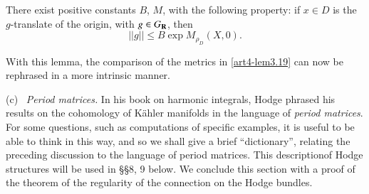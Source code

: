 \setcounter{lemma}{22}
\begin{lemma}\label{art4-lem3.23}
There exist positive constants $B$, $M$, with the following property: if $x \in D$ is the $g$-translate of the origin, with $g \in G_{\mathbf{R}}$, then
$$
||g|| \leqslant B \exp M_{\rho_D} (X,0).
$$
\end{lemma}

With this lemma, the comparison of the metrics in \eqref{art4-lem3.19} can now be rephrased in a more intrinsic manner.

\medskip
\noindent
(c)~ \textit{Period matrices.} In his book \cite{art4-key30} on harmonic integrals, Hodge phrased his results on the cohomology of K\"ahler manifolds in the language of \textit{period matrices}. For some questions, such as computations of specific examples, it is useful to be able to think in this way, and so we shall give a brief ``dictionary'', relating the preceding discussion to the language of period matrices. This description\pageoriginale of Hodge structures will be used in \S \S 8, 9 below. We conclude this section with a proof of the theorem of the regularity of the connection on the Hodge bundles.

